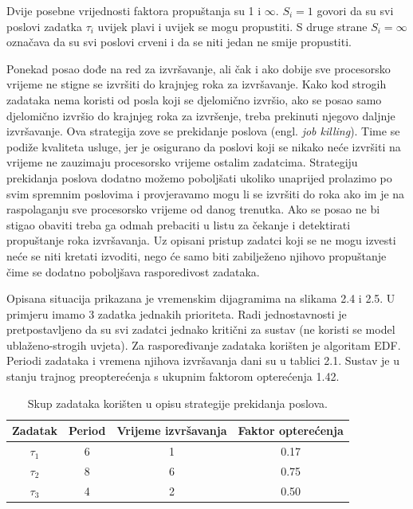 \documentclass[../zavrsni.tex]{subfiles}
\begin{document}
Dvije posebne vrijednosti faktora propuštanja su 1 i $\infty$. $S_i=1$ govori da su svi poslovi zadatka $\tau_i$ uvijek plavi i uvijek se 
mogu propustiti. S druge strane $S_i=\infty$ označava da su svi poslovi crveni i da se niti jedan ne smije propustiti.

Ponekad posao dođe na red za izvršavanje, ali čak i ako dobije sve procesorsko vrijeme ne stigne se izvršiti do krajnjeg roka za izvršavanje.
Kako kod strogih zadataka nema koristi od posla koji se djelomično izvršio, ako se posao samo djelomično izvršio do krajnjeg roka za izvršenje, 
treba prekinuti njegovo daljnje izvršavanje.
 Ova strategija zove se prekidanje poslova 
 (engl. \textit{job killing}). Time se podiže kvaliteta usluge, jer je osigurano da poslovi koji se nikako neće 
 izvršiti na vrijeme ne zauzimaju procesorsko vrijeme ostalim zadatcima. Strategiju prekidanja poslova dodatno možemo poboljšati
 ukoliko unaprijed prolazimo po svim spremnim poslovima i provjeravamo mogu li se izvršiti do roka ako im je na raspolaganju sve 
 procesorsko vrijeme od danog trenutka. Ako se posao ne bi stigao obaviti treba ga odmah prebaciti u listu za čekanje i detektirati 
 propuštanje roka izvršavanja. Uz opisani pristup zadatci koji se ne mogu izvesti neće se niti kretati izvoditi, nego će samo
 biti zabilježeno njihovo propuštanje čime se dodatno poboljšava rasporedivost zadataka.

Opisana situacija prikazana je vremenskim dijagramima na slikama 2.4 i 2.5. U primjeru imamo 3 zadatka jednakih prioriteta. Radi jednostavnosti
je pretpostavljeno da su svi zadatci jednako kritični za sustav (ne koristi se model ublaženo-strogih uvjeta). Za raspoređivanje zadataka korišten je algoritam EDF. 
Periodi zadataka i vremena njihova izvršavanja dani su u tablici 2.1. Sustav je u stanju trajnog preopterećenja s ukupnim
faktorom opterećenja 1.42.

\begin{table}[h!]
\begin{center}
  \begin{tabular}{||c || c | c | c||} 
   \hline
   Zadatak & Period & Vrijeme izvršavanja & Faktor opterećenja \\ [0.5ex] 
   \hline\hline
   $\tau_1$ & 6 & 1 & 0.17 \\ 
   \hline
   $\tau_2$ & 8 & 6 & 0.75 \\
   \hline
   $\tau_3$ & 4 & 2 & 0.50 \\
   \hline
  \end{tabular}
\end{center}
\caption{\label{tab:table-name}Skup zadataka korišten u opisu strategije prekidanja poslova.}
\end{table}
\end{document}
